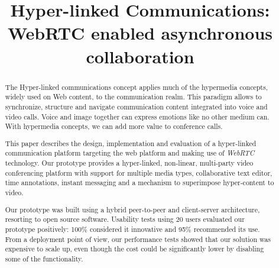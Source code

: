 \documentclass[10pt,conference]{IEEEtran}
\begin{document}
\title{Hyper-linked Communications: WebRTC enabled asynchronous collaboration}

\author{
\and
{}
}

\maketitle

\begin{abstract}
The Hyper-linked communications concept applies much of the hypermedia concepts, widely used on Web content, to the communication realm.
This paradigm allows to synchronize, structure and navigate communication content integrated into voice and video calls.
Voice and image together can express emotions like no other medium can. With hypermedia concepts, we can add more value to conference calls.

This paper describes the design, implementation and evaluation of a hyper-linked communication platform targeting the web platform and making use of \emph{WebRTC} technology.
Our prototype provides a hyper-linked, non-linear, multi-party video conferencing platform with support for multiple media types, collaborative text editor, time annotations, instant messaging and a mechanism to superimpose hyper-content to video.

Our prototype was built using a hybrid peer-to-peer and client-server architecture, resorting to open source software.
Usability tests using 20 users evaluated our prototype positively: 100\% considered it innovative and 95\% recommended its use. 
From a deployment point of view, our performance tests showed that our solution was expensive to scale up, even though the cost could be significantly lower by disabling some of the functionality.


\end{abstract}

\IEEEpeerreviewmaketitle
\end{document}
